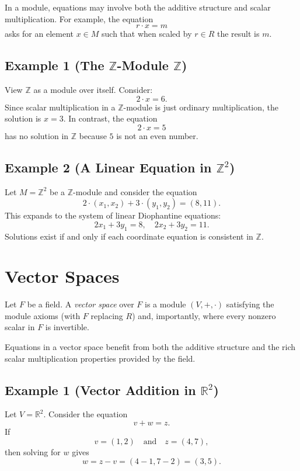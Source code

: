 \documentclass[11pt,openany]{article}
\begin{document}
In a module, equations may involve both the additive structure and scalar multiplication. For example, the equation
\[
r\cdot x = m
\]
asks for an element \(x\in M\) such that when scaled by \(r\in R\) the result is \(m\).

\subsection*{Example 1 (The \(\mathbb{Z}\)-Module \(\mathbb{Z}\))}
View \(\mathbb{Z}\) as a module over itself. Consider:
\[
2\cdot x = 6.
\]
Since scalar multiplication in a \(\mathbb{Z}\)-module is just ordinary multiplication, the solution is \(x=3\). In contrast, the equation
\[
2\cdot x = 5
\]
has no solution in \(\mathbb{Z}\) because \(5\) is not an even number.

\subsection*{Example 2 (A Linear Equation in \(\mathbb{Z}^2\))}
Let \(M=\mathbb{Z}^2\) be a \(\mathbb{Z}\)-module and consider the equation
\[
2\cdot (x_1,x_2) + 3\cdot (y_1,y_2) = (8,11).
\]
This expands to the system of linear Diophantine equations:
\[
2x_1+3y_1 = 8, \quad 2x_2+3y_2 = 11.
\]
Solutions exist if and only if each coordinate equation is consistent in \(\mathbb{Z}\).

\section{Vector Spaces}
\begin{definition}
	Let \(F\) be a field. A \emph{vector space} over \(F\) is a module \((V,+,\cdot)\) satisfying the module axioms (with \(F\) replacing \(R\)) and, importantly, where every nonzero scalar in \(F\) is invertible.
\end{definition}

Equations in a vector space benefit from both the additive structure and the rich scalar multiplication properties provided by the field.

\subsection*{Example 1 (Vector Addition in \(\mathbb{R}^2\))}
Let \(V=\mathbb{R}^2\). Consider the equation
\[
v + w = z.
\]
If
\[
v = (1,2) \quad \text{and} \quad z = (4,7),
\]
then solving for \(w\) gives
\[
w = z - v = (4-1,7-2) = (3,5).
\]
\end{document}
